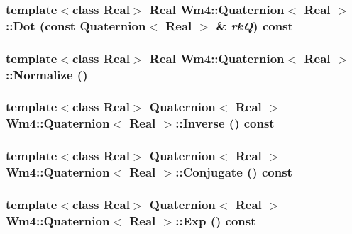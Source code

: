 \subsubsection{\setlength{\rightskip}{0pt plus 5cm}template$<$class Real$>$ Real {\bf Wm4::Quaternion}$<$ Real $>$::Dot (const {\bf Quaternion}$<$ Real $>$ \& {\em rk\-Q}) const\hspace{0.3cm}{\tt  [inline]}}\label{classWm4_1_1Quaternion_ea8c4800425d134db760bda44f5944bc}


\subsubsection{\setlength{\rightskip}{0pt plus 5cm}template$<$class Real$>$ Real {\bf Wm4::Quaternion}$<$ Real $>$::Normalize ()\hspace{0.3cm}{\tt  [inline]}}\label{classWm4_1_1Quaternion_b0df70264339a14241a2513883ece903}


\subsubsection{\setlength{\rightskip}{0pt plus 5cm}template$<$class Real$>$ {\bf Quaternion}$<$ Real $>$ {\bf Wm4::Quaternion}$<$ Real $>$::Inverse () const}\label{classWm4_1_1Quaternion_7adcfaa96c967518766a075832934f05}


\subsubsection{\setlength{\rightskip}{0pt plus 5cm}template$<$class Real$>$ {\bf Quaternion}$<$ Real $>$ {\bf Wm4::Quaternion}$<$ Real $>$::Conjugate () const}\label{classWm4_1_1Quaternion_ff8905d1a688dcbf07892de3be596b12}


\subsubsection{\setlength{\rightskip}{0pt plus 5cm}template$<$class Real$>$ {\bf Quaternion}$<$ Real $>$ {\bf Wm4::Quaternion}$<$ Real $>$::Exp () const}\label{classWm4_1_1Quaternion_fb4d38887cbd2c753ba7251c9447227a}


